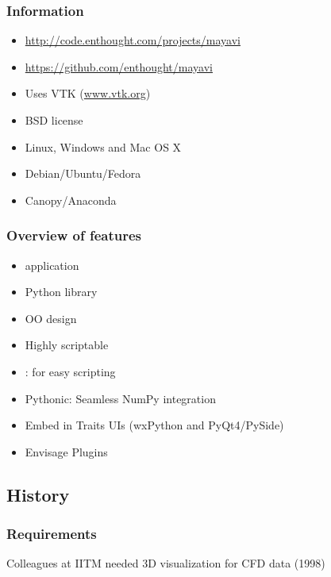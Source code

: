 \begin{frame}
  \frametitle{Information}
  \begin{itemize}
  \item \url{http://code.enthought.com/projects/mayavi}
  \item \url{https://github.com/enthought/mayavi}
  \item Uses VTK (\url{www.vtk.org})
  \item BSD license
  \item Linux, Windows and Mac OS X
  \item Debian/Ubuntu/Fedora
  \item Canopy/Anaconda
  \end{itemize}
\end{frame}

\begin{frame}
  \frametitle{Overview of features}
  \begin{itemize}
  \item {} application
  \item Python library
  \item OO design
  \item Highly scriptable
  \item {}: for easy scripting
  \item \alert{Pythonic}: Seamless NumPy integration
  \item Embed in Traits UIs (wxPython and PyQt4/PySide)
  \item Envisage Plugins
  \end{itemize}
\end{frame}

\subsection{History}

\begin{frame}
    \frametitle{Requirements}
    \Large
    \begin{center}
        Colleagues at IITM needed 3D visualization for CFD data (1998)
    \end{center}
\end{frame}

\begin{frame}[plain]
    \Large
    \begin{center}
    \end{center}
\end{frame}

